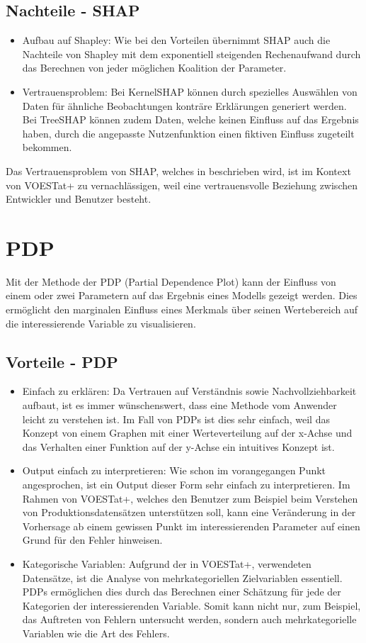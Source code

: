 \documentclass[12pt,titlepage,oneside]{book}
\begin{document}
\subsection{Nachteile - SHAP}
\begin{itemize}
    \item Aufbau auf Shapley: Wie bei den Vorteilen übernimmt SHAP auch die Nachteile von Shapley mit dem exponentiell steigenden Rechenaufwand durch das Berechnen von jeder möglichen Koalition der Parameter.
    \item Vertrauensproblem: Bei KernelSHAP können durch spezielles Auswählen von Daten für ähnliche Beobachtungen konträre Erklärungen generiert werden. Bei TreeSHAP können zudem Daten, welche keinen Einfluss auf das Ergebnis haben, durch die angepasste Nutzenfunktion einen fiktiven Einfluss zugeteilt bekommen.
\end{itemize}

Das Vertrauensproblem von SHAP, welches in \cite{slack2020fooling} beschrieben wird, ist im Kontext von VOESTat+ zu vernachlässigen, weil eine vertrauensvolle Beziehung zwischen Entwickler und Benutzer besteht. 

\newpage
\section{PDP}
Mit der Methode der PDP (Partial Dependence Plot) kann der Einfluss von einem oder zwei Parametern auf das Ergebnis eines Modells gezeigt werden. Dies ermöglicht den marginalen Einfluss eines Merkmals über seinen Wertebereich auf die interessierende Variable zu visualisieren.
\subsection{Vorteile - PDP}
\begin{itemize}
    \item Einfach zu erklären: Da Vertrauen auf Verständnis sowie Nachvollziehbarkeit aufbaut, ist es immer wünschenswert, dass eine Methode vom Anwender leicht zu verstehen ist. Im Fall von PDPs ist dies sehr einfach, weil das Konzept von einem Graphen mit einer Werteverteilung auf der x-Achse und das Verhalten einer Funktion auf der y-Achse ein intuitives Konzept ist.
    \item Output einfach zu interpretieren: Wie schon im vorangegangen Punkt angesprochen, ist ein Output dieser Form sehr einfach zu interpretieren. Im Rahmen von VOESTat+, welches den Benutzer zum Beispiel beim Verstehen von Produktionsdatensätzen unterstützen soll, kann eine Veränderung in der Vorhersage ab einem gewissen Punkt im interessierenden Parameter auf einen Grund für den Fehler hinweisen.
    \item Kategorische Variablen: Aufgrund der in VOESTat+, verwendeten Datensätze, ist die Analyse von mehrkategoriellen Zielvariablen essentiell. PDPs ermöglichen dies durch das Berechnen einer Schätzung für jede der Kategorien der interessierenden Variable. Somit kann nicht nur, zum Beispiel, das Auftreten von Fehlern untersucht werden, sondern auch mehrkategorielle Variablen wie die Art des Fehlers.
\end{itemize}
\end{document}
